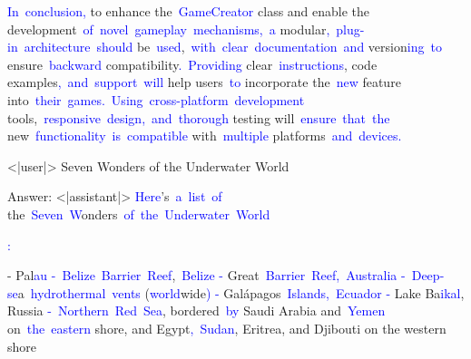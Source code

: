 \documentclass{article}
\begin{document}
\begin{tcolorbox}[colframe=black,colback=white]
{}\textcolor{blue}{In}\textcolor{blue}{~conclusion}\textcolor{blue}{,} to enhance the\textcolor{blue}{~Game}\textcolor{blue}{Creator} class and enable the development\textcolor{blue}{~of}\textcolor{blue}{~novel}\textcolor{blue}{~gameplay}\textcolor{blue}{~mechanisms}\textcolor{blue}{,}\textcolor{blue}{~a} modular\textcolor{blue}{,}\textcolor{blue}{~plug}\textcolor{blue}{-in}\textcolor{blue}{~architecture}\textcolor{blue}{~should} be\textcolor{blue}{~used},\textcolor{blue}{~with}\textcolor{blue}{~clear}\textcolor{blue}{~documentation}\textcolor{blue}{~and} version\textcolor{blue}{ing}\textcolor{blue}{~to} ensure\textcolor{blue}{~backward} compatibility\textcolor{blue}{.}\textcolor{blue}{~Providing} clear\textcolor{blue}{~instructions}, code examples\textcolor{blue}{,}\textcolor{blue}{~and}\textcolor{blue}{~support}\textcolor{blue}{~will} help users\textcolor{blue}{~to} incorporate the\textcolor{blue}{~new} feature into\textcolor{blue}{~their}\textcolor{blue}{~games}\textcolor{blue}{.}\textcolor{blue}{~Using}\textcolor{blue}{~cross}\textcolor{blue}{-platform}\textcolor{blue}{~development} tools,\textcolor{blue}{~responsive}\textcolor{blue}{~design}\textcolor{blue}{,}\textcolor{blue}{~and}\textcolor{blue}{~thorough} testing will\textcolor{blue}{~ensure}\textcolor{blue}{~that}\textcolor{blue}{~the} new\textcolor{blue}{~functionality}\textcolor{blue}{~is}\textcolor{blue}{~compatible} with\textcolor{blue}{~multiple} platforms\textcolor{blue}{~and}\textcolor{blue}{~devices}\textcolor{blue}{.}\textcolor{blue}{}
\end{tcolorbox}


\begin{tcolorbox}[colframe=black,colback=white]
<|user|>
Seven Wonders of the Underwater World

Answer:
<|assistant|>
\textcolor{blue}{Here}'s\textcolor{blue}{~a}\textcolor{blue}{~list}\textcolor{blue}{~of} the\textcolor{blue}{~Seven}\textcolor{blue}{~W}onders\textcolor{blue}{~of}\textcolor{blue}{~the}\textcolor{blue}{~Under}\textcolor{blue}{water}\textcolor{blue}{~World}\textcolor{blue}{:

}- Pal\textcolor{blue}{au}\textcolor{blue}{
}\textcolor{blue}{-}\textcolor{blue}{~Belize}\textcolor{blue}{~Barrier}\textcolor{blue}{~Reef},\textcolor{blue}{~Belize}\textcolor{blue}{
}\textcolor{blue}{-} Great\textcolor{blue}{~Barrier}\textcolor{blue}{~Reef}\textcolor{blue}{,}\textcolor{blue}{~Australia}\textcolor{blue}{
}\textcolor{blue}{-}\textcolor{blue}{~Deep}\textcolor{blue}{-se}a\textcolor{blue}{~hydro}\textcolor{blue}{thermal}\textcolor{blue}{~vents} (\textcolor{blue}{world}wide\textcolor{blue}{)
}\textcolor{blue}{-} Galápagos\textcolor{blue}{~Islands}\textcolor{blue}{,}\textcolor{blue}{~Ecuador}\textcolor{blue}{
}\textcolor{blue}{-} Lake Ba\textcolor{blue}{ikal}, Russia\textcolor{blue}{
}\textcolor{blue}{-}\textcolor{blue}{~Northern}\textcolor{blue}{~Red}\textcolor{blue}{~Sea}, bordered\textcolor{blue}{~by} Saudi Arabia and\textcolor{blue}{~Yemen} on\textcolor{blue}{~the}\textcolor{blue}{~eastern} shore, and Egypt\textcolor{blue}{,}\textcolor{blue}{~Sudan}, Eritrea, and Djibouti on the western shore\textcolor{blue}{}
\end{tcolorbox}
\end{document}
